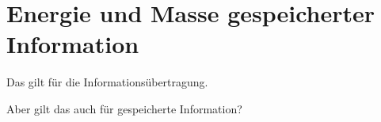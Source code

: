 \documentclass[aspectratio=169]{beamer}
\begin{document}
\section{Energie und Masse gespeicherter Information}
\centering\begin{frame}[fragile]{\insertsection}{\insertsubsection}
Das gilt für die Informationsübertragung.

Aber gilt das auch für gespeicherte Information?
\end{frame}
\end{document}
